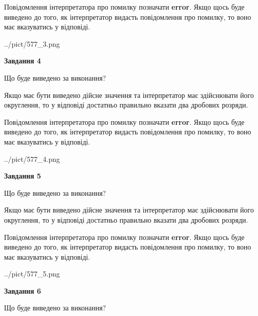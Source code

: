 \documentclass[12pt, ukrainian]{article}
\begin{document}
{\begin {Large}
Повідомлення інтерпретатора про помилку позначати \textbf{error}.
Якщо щось буде виведено до того, як інтерпретатор видасть повідомлення про помилку, 
то воно має вказуватись у відповіді. \par

\begin{center}
	{../pict/577_3.png}
\end{center}
\newpage

{\begin {center}\textbf{Завдання 4}\end {center}}\par
Що буде виведено за виконання? \par

Якщо має бути виведено дійсне значення та інтерпретатор має здійснювати його округлення, 
то у відповіді достатньо правильно вказати два дробових розряди.

Повідомлення інтерпретатора про помилку позначати \textbf{error}.
Якщо щось буде виведено до того, як інтерпретатор видасть повідомлення про помилку, 
то воно має вказуватись у відповіді. \par

\begin{center}
	{../pict/577_4.png}
\end{center}
\newpage

{\begin {center}\textbf{Завдання 5}\end {center}}\par
Що буде виведено за виконання? \par

Якщо має бути виведено дійсне значення та інтерпретатор має здійснювати його округлення, 
то у відповіді достатньо правильно вказати два дробових розряди.

Повідомлення інтерпретатора про помилку позначати \textbf{error}.
Якщо щось буде виведено до того, як інтерпретатор видасть повідомлення про помилку, 
то воно має вказуватись у відповіді. \par

\begin{center}
	{../pict/577_5.png}
\end{center}
\newpage

{\begin {center}\textbf{Завдання 6}\end {center}}\par
Що буде виведено за виконання? \par


\end{Large}}
\end{document}
